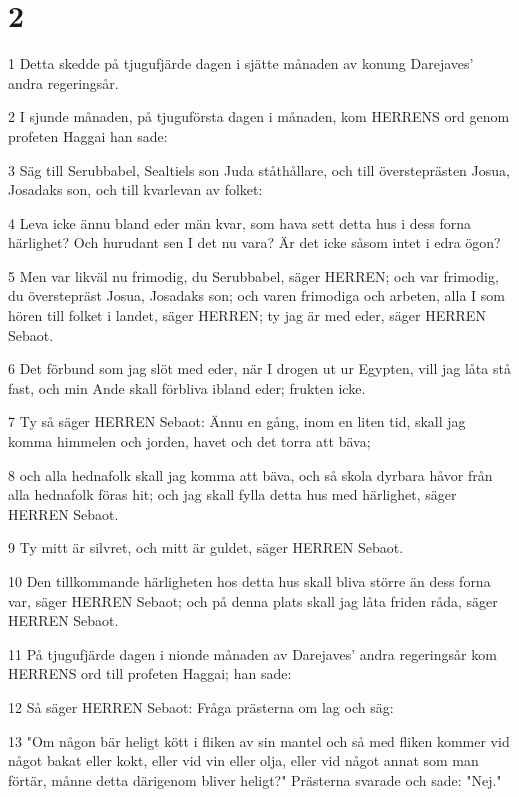 \chapter{2}

\par 1 Detta skedde på tjugufjärde dagen i sjätte månaden av konung Darejaves' andra regeringsår.
\par 2 I sjunde månaden, på tjuguförsta dagen i månaden, kom HERRENS ord genom profeten Haggai han sade:
\par 3 Säg till Serubbabel, Sealtiels son Juda ståthållare, och till översteprästen Josua, Josadaks son, och till kvarlevan av folket:
\par 4 Leva icke ännu bland eder män kvar, som hava sett detta hus i dess forna härlighet? Och hurudant sen I det nu vara? Är det icke såsom intet i edra ögon?
\par 5 Men var likväl nu frimodig, du Serubbabel, säger HERREN; och var frimodig, du överstepräst Josua, Josadaks son; och varen frimodiga och arbeten, alla I som hören till folket i landet, säger HERREN; ty jag är med eder, säger HERREN Sebaot.
\par 6 Det förbund som jag slöt med eder, när I drogen ut ur Egypten, vill jag låta stå fast, och min Ande skall förbliva ibland eder; frukten icke.
\par 7 Ty så säger HERREN Sebaot: Ännu en gång, inom en liten tid, skall jag komma himmelen och jorden, havet och det torra att bäva;
\par 8 och alla hednafolk skall jag komma att bäva, och så skola dyrbara håvor från alla hednafolk föras hit; och jag skall fylla detta hus med härlighet, säger HERREN Sebaot.
\par 9 Ty mitt är silvret, och mitt är guldet, säger HERREN Sebaot.
\par 10 Den tillkommande härligheten hos detta hus skall bliva större än dess forna var, säger HERREN Sebaot; och på denna plats skall jag låta friden råda, säger HERREN Sebaot.
\par 11 På tjugufjärde dagen i nionde månaden av Darejaves' andra regeringsår kom HERRENS ord till profeten Haggai; han sade:
\par 12 Så säger HERREN Sebaot: Fråga prästerna om lag och säg:
\par 13 "Om någon bär heligt kött i fliken av sin mantel och så med fliken kommer vid något bakat eller kokt, eller vid vin eller olja, eller vid något annat som man förtär, månne detta därigenom bliver heligt?" Prästerna svarade och sade: "Nej."
